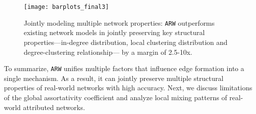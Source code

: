 \begin{figure}
	\centering
	\vspace{-15pt}
	\texttt{[image: barplots\_final3]}
	\caption{Jointly modeling multiple network properties: \texttt{ARW} outperforms
		existing network models in jointly preserving key structural properties---in-degree
		distribution, local clustering distribution and degree-clustering relationship---
		by a margin of 2.5-10x.
	}
	\vspace{-13pt}
	\label{fig:barplot}
\end{figure}





To summarize, \texttt{ARW} unifies multiple factors that influence edge formation
into a single mechanism. As a result, it can jointly preserve multiple structural
properties of real-world networks with high accuracy. Next, we discuss limitations
of the global assortativity coefficient and analyze local mixing patterns of
real-world attributed networks.


